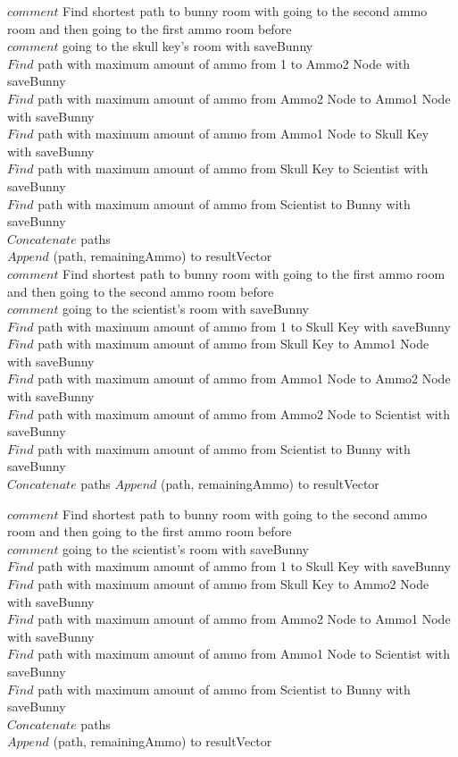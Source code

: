 \documentclass[10pt]{article}
\begin{document}
		$comment$  Find shortest path to bunny room with going to the second ammo room and then going to the first ammo room before  \\
		$comment$ going to the skull key's room with saveBunny \\
		 $Find$ path with maximum amount of ammo from 1 to Ammo2 Node with saveBunny  \\
		 $Find$ path with maximum amount of ammo from Ammo2 Node to Ammo1 Node with saveBunny \\
		 $Find$ path with maximum amount of ammo from Ammo1 Node to Skull Key with saveBunny \\
		 $Find$ path with maximum amount of ammo from Skull Key to Scientist with saveBunny \\
		 $Find$ path with maximum amount of ammo from Scientist to Bunny with saveBunny \\
		$Concatenate$ paths  \\
		$Append$ (path, remainingAmmo) to resultVector \\

		$comment$  Find shortest path to bunny room with going to the first ammo room and then going to the second ammo room before  \\
		$comment$ going to the scientist's room with saveBunny \\
		 $Find$ path with maximum amount of ammo from 1 to Skull Key with saveBunny  \\
		 $Find$ path with maximum amount of ammo from Skull Key to Ammo1 Node with saveBunny \\
		 $Find$ path with maximum amount of ammo from Ammo1 Node to Ammo2 Node with saveBunny \\
		 $Find$ path with maximum amount of ammo from Ammo2 Node to Scientist with saveBunny \\
		 $Find$ path with maximum amount of ammo from Scientist to Bunny with saveBunny \\
		$Concatenate$ paths 
		$Append$ (path, remainingAmmo) to resultVector

		$comment$  Find shortest path to bunny room with going to the second ammo room and then going to the first ammo room before  \\
		$comment$ going to the scientist's room with saveBunny \\
		 $Find$ path with maximum amount of ammo from 1 to Skull Key with saveBunny  \\
		 $Find$ path with maximum amount of ammo from Skull Key to Ammo2 Node with saveBunny \\
		 $Find$ path with maximum amount of ammo from Ammo2 Node to Ammo1 Node with saveBunny \\
		 $Find$ path with maximum amount of ammo from Ammo1 Node to Scientist with saveBunny \\
		 $Find$ path with maximum amount of ammo from Scientist to Bunny with saveBunny \\
		$Concatenate$ paths  \\
		$Append$ (path, remainingAmmo) to resultVector \\
\end{document}
